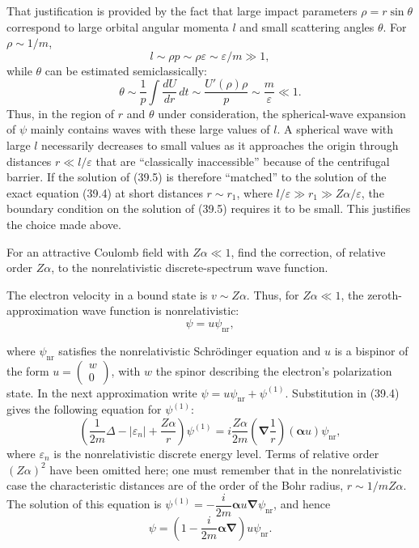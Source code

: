 That justification is provided by the fact that large impact parameters $\rho=r\sin\theta$ correspond to large orbital angular momenta $l$ and small scattering angles $\theta$. For $\rho\sim1/m$,
\[
l\sim\rho p\sim\rho\varepsilon\sim\varepsilon/m\gg1,
\]
while $\theta$ can be estimated semiclassically:
\[
\theta\sim\frac1p\int\frac{dU}{dr}\,dt
\sim\frac{U'(\rho)\rho}{p}\sim\frac m\varepsilon\ll1.
\]
Thus, in the region of $r$ and $\theta$ under consideration, the spherical-wave expansion of $\psi$ mainly contains waves with these large values of $l$. A spherical wave with large $l$ necessarily decreases to small values as it approaches the origin through distances $r\ll l/\varepsilon$ that are ``classically inaccessible'' because of the centrifugal barrier. If the solution of (39.5) is therefore ``matched'' to the solution of the exact equation (39.4) at short distances $r\sim r_1$, where $l/\varepsilon\gg r_1\gg Z\alpha/\varepsilon$, the boundary condition on the solution of (39.5) requires it to be small. This justifies the choice made above.

\ProblemHeading

For an attractive Coulomb field with $Z\alpha\ll1$, find the correction, of relative order $Z\alpha$, to the nonrelativistic discrete-spectrum wave function.

\SolutionHeading The electron velocity in a bound state is $v\sim Z\alpha$. Thus, for $Z\alpha\ll1$, the zeroth-approximation wave function is nonrelativistic:
\[
\psi=u\psi_{\mathrm{nr}},
\]

where $\psi_{\mathrm{nr}}$ satisfies the nonrelativistic Schrödinger equation and $u$ is a bispinor of the form $u=\begin{pmatrix}w\\0\end{pmatrix}$, with $w$ the spinor describing the electron's polarization state. In the next approximation write $\psi=u\psi_{\mathrm{nr}}+\psi^{(1)}$. Substitution in (39.4) gives the following equation for $\psi^{(1)}$:
\[
\left(\frac1{2m}\Delta-|\varepsilon_n|+\frac{Z\alpha}{r}\right)\psi^{(1)}
=i\frac{Z\alpha}{2m}\left(\boldsymbol\nabla\frac1r\right)
(\boldsymbol\alpha u)\psi_{\mathrm{nr}},
\]
where $\varepsilon_n$ is the nonrelativistic discrete energy level. Terms of relative order $(Z\alpha)^2$ have been omitted here; one must remember that in the nonrelativistic case the characteristic distances are of the order of the Bohr radius, $r\sim1/mZ\alpha$. The solution of this equation is $\psi^{(1)}=-\dfrac i{2m}\boldsymbol\alpha u\boldsymbol\nabla\psi_{\mathrm{nr}}$, and hence
\[
\psi=\left(1-\frac i{2m}\boldsymbol\alpha\boldsymbol\nabla\right)
u\psi_{\mathrm{nr}}.
\]
